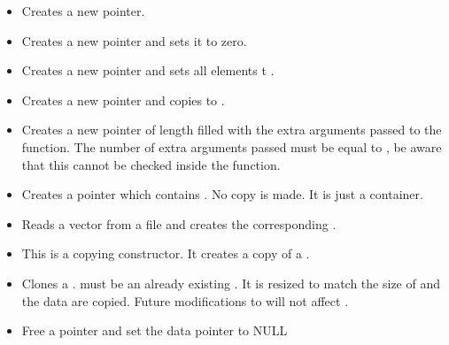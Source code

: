 \begin{itemize}
\item {}
  \sshortdescribe Creates a new  pointer.  
\item {}
  \sshortdescribe Creates a new  pointer and sets it to zero.  
\item {}
  \sshortdescribe Creates a new  pointer and sets all
  elements t .  
\item {}
  \sshortdescribe Creates a new  pointer and copies 
  to .  
\item {}
  \sshortdescribe Creates a new  pointer of length
   filled with the extra arguments passed to the function. The
  number of extra arguments passed must be equal to , be aware that
  this cannot be checked inside the function.
\item {}
  \sshortdescribe Creates a  pointer which contains
  . No copy is made. It is just a container.
  
\item {}
  \sshortdescribe Reads a vector from a file and creates the corresponding .  

\item {}
  \sshortdescribe This is a copying constructor. It creates a copy of a .
\item {} 
  \sshortdescribe Clones a .  must be an
  already existing  . It is resized to match the size of
   and the data are copied. Future modifications to  will not
  affect .

\item {}
  \sshortdescribe Free a  pointer and set the data pointer to NULL  
\end{itemize}

